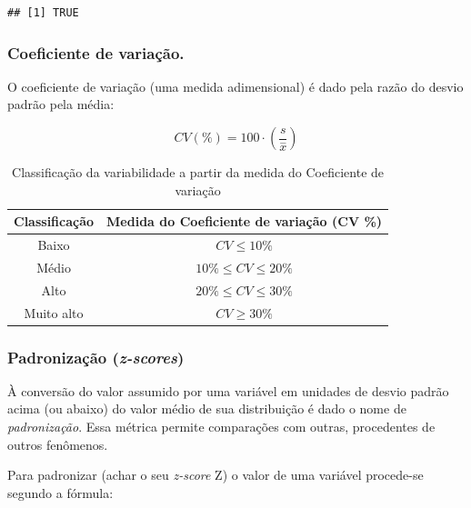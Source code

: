 \documentclass[
]{book}
\begin{document}
\begin{verbatim}
## [1] TRUE
\end{verbatim}

\hypertarget{coeficiente-de-variauxe7uxe3o.}{%
\subsubsection{Coeficiente de variação.}\label{coeficiente-de-variauxe7uxe3o.}}

\hfill\break

O coeficiente de variação (uma medida adimensional) é dado pela razão do desvio padrão pela média:

\hfill\break

\[
CV(\%)= 100\cdot(\frac{s}{\stackrel{-}{x}})
\]

\hfill\break

\begin{table}[h]
\centering
\caption{Classificação da variabilidade a partir da medida do Coeficiente de variação}
\begin{tabular}{|c|c|}
\hline 
Classificação  & Medida do Coeficiente de variação (CV \%) \\ 
\hline 
Baixo & $CV \le 10\%$ \\
\hline 
Médio  & $10\% \le CV \le 20\%$ \\
\hline 
Alto  & $20\% \le CV \le 30\%$ \\
\hline 
Muito alto & $CV \ge 30\%$ \\
\hline 
\end{tabular}
\end{table}

\hfill\break

\hypertarget{padronizauxe7uxe3o-z-scores}{%
\subsubsection{\texorpdfstring{Padronização (\emph{z-scores})}{Padronização (z-scores)}}\label{padronizauxe7uxe3o-z-scores}}

\hfill\break

À conversão do valor assumido por uma variável em unidades de desvio padrão acima (ou abaixo) do valor médio de sua distribuição é dado o nome de \emph{padronização}. Essa métrica permite comparações com outras, procedentes de outros fenômenos.

\hfill\break

Para padronizar (achar o seu \emph{z-score} Z) o valor de uma variável procede-se segundo a fórmula:
\end{document}
